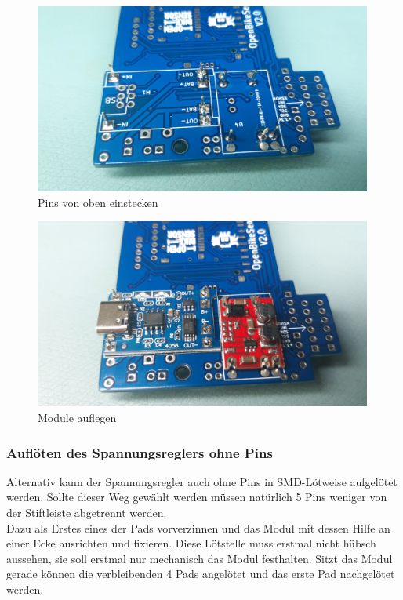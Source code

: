 \documentclass[12pt, a4paper]{article}		%
\begin{document}
\begin{minipage}[t]{0.49\textwidth}
\begin{figure}[H]
	\centering
		\includegraphics[width=0.99\textwidth]{Grafiken/20200726_123048.jpg}
	\caption{Pins von oben einstecken}
	\label{fig:20200726_121444}
\end{figure}
\end{minipage}
\begin{minipage}[t]{0.49\textwidth}
\begin{figure}[H]
	\centering
		\includegraphics[width=0.99\textwidth]{Grafiken/20200726_123110.jpg}
	\caption{Module auflegen}
	\label{fig:20200726_121444}
\end{figure}
\end{minipage}
\newline

\subsubsection{Auflöten des Spannungsreglers ohne Pins}

Alternativ kann der Spannungsregler auch ohne Pins in SMD-Lötweise aufgelötet werden. Sollte dieser Weg gewählt werden müssen natürlich 5 Pins weniger von der Stiftleiste abgetrennt werden.\\
 Dazu als Erstes eines der Pads vorverzinnen und das Modul mit dessen Hilfe an einer Ecke ausrichten und fixieren. Diese Lötstelle muss erstmal nicht hübsch aussehen, sie soll erstmal nur mechanisch das Modul festhalten. Sitzt das Modul gerade können die verbleibenden 4 Pads angelötet und das erste Pad nachgelötet werden.
\end{document}
